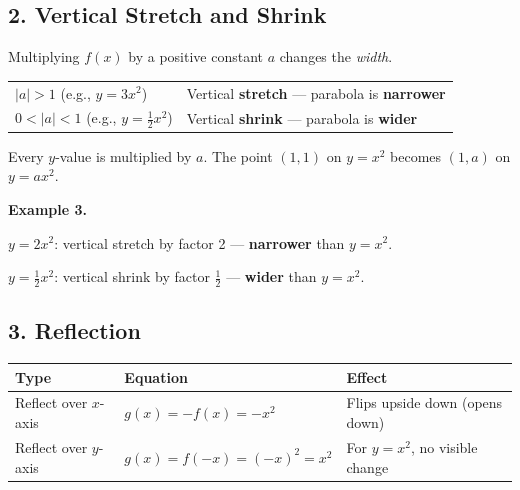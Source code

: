 \documentclass[11pt]{article}
\begin{document}
\subsection*{2. \; Vertical Stretch and Shrink}

Multiplying $f(x)$ by a positive constant $a$ changes the \textit{width}.

\begin{center}
\renewcommand{\arraystretch}{1.5}
\begin{tabular}{|l|l|}
\hline
$|a| > 1$ \quad (e.g., $y = 3x^2$)          & Vertical \textbf{stretch} --- parabola is \textbf{narrower} \\
$0 < |a| < 1$ \quad (e.g., $y = \tfrac{1}{2}x^2$) & Vertical \textbf{shrink} --- parabola is \textbf{wider} \\
\hline
\end{tabular}
\end{center}

\medskip
Every $y$-value is multiplied by $a$.
The point $(1,1)$ on $y = x^2$ becomes $(1,a)$ on $y = ax^2$.

\begin{exbox}
\textbf{Example 3.}

$y = 2x^2$: vertical stretch by factor 2 --- \textbf{narrower} than $y = x^2$.

$y = \tfrac{1}{2}x^2$: vertical shrink by factor $\tfrac{1}{2}$ --- \textbf{wider} than $y = x^2$.
\end{exbox}

\subsection*{3. \; Reflection}

\begin{center}
\renewcommand{\arraystretch}{1.5}
\begin{tabular}{|l|l|l|}
\hline
\textbf{Type} & \textbf{Equation} & \textbf{Effect} \\
\hline
Reflect over $x$-axis & $g(x) = -f(x) = -x^2$    & Flips upside down (opens down) \\
Reflect over $y$-axis & $g(x) = f(-x) = (-x)^2 = x^2$ & For $y=x^2$, no visible change \\
\hline
\end{tabular}
\end{center}
\end{document}
